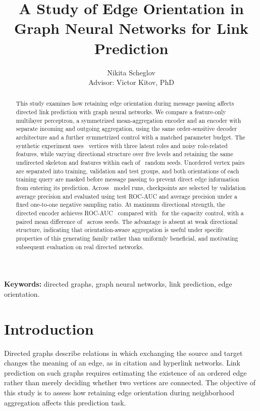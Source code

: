 \documentclass{article}
\title{A Study of Edge Orientation in Graph Neural Networks for Link Prediction}
\author{Nikita Scheglov\\Advisor: Victor Kitov, PhD}
\begin{document}
\maketitle
\begin{abstract}
This study examines how retaining edge orientation during message passing affects directed link prediction with graph neural networks. We compare a feature-only multilayer perceptron, a symmetrized mean-aggregation encoder and an encoder with separate incoming and outgoing aggregation, using the same order-sensitive decoder architecture and a further symmetrized control with a matched parameter budget. The synthetic experiment uses \ExperimentN\ vertices with three latent roles and noisy role-related features, while varying directional structure over five levels and retaining the same undirected skeleton and features within each of \ExperimentSeedCount\ random seeds. Unordered vertex pairs are separated into training, validation and test groups, and both orientations of each training query are masked before message passing to prevent direct edge information from entering its prediction. Across \ExperimentRunCount\ model runs, checkpoints are selected by validation average precision and evaluated using test ROC-AUC and average precision under a fixed one-to-one negative sampling ratio. At maximum directional strength, the directed encoder achieves ROC-AUC \DirectedAUCMean\ compared with \ControlAUCMean\ for the capacity control, with a paired mean difference of \DeltaAUCMean\ across seeds. The advantage is absent at weak directional structure, indicating that orientation-aware aggregation is useful under specific properties of this generating family rather than uniformly beneficial, and motivating subsequent evaluation on real directed networks.
\end{abstract}
\textbf{Keywords:} directed graphs, graph neural networks, link prediction, edge orientation.

\section{Introduction}
Directed graphs describe relations in which exchanging the source and target changes the meaning of an edge, as in citation and hyperlink networks.
Link prediction on such graphs requires estimating the existence of an ordered edge rather than merely deciding whether two vertices are connected.
The objective of this study is to assess how retaining edge orientation during neighborhood aggregation affects this prediction task.
\end{document}
